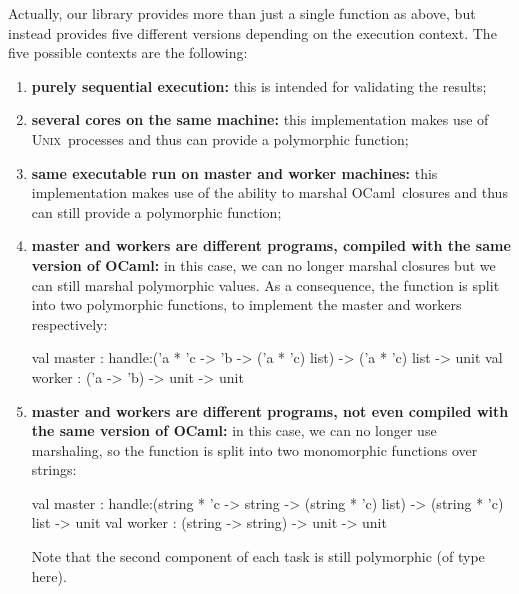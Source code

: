 \documentclass[preprint]{sigplanconf}
\newcommand{\Ocaml}{OCaml}
\newcommand{\unix}{\textsc{Unix}}
\begin{document}
Actually, our library provides more than just a single 
function as above, but instead provides five different versions
depending on the execution context. The five possible contexts are the
following: 
\begin{enumerate}
\item \textbf{purely sequential execution:}
  this is intended for validating the results;

\item \textbf{several cores on the same machine:} 
  this implementation makes use of \unix\ processes and thus can
  provide a polymorphic  function;

\item \textbf{same executable run on master and worker machines:}
  this implementation makes use of the ability to marshal \Ocaml\
  closures and thus can still provide a polymorphic  function;

\item \textbf{master and workers are different programs, compiled with
    the same version of \Ocaml:} 
  in this case, we can no longer marshal closures but we can still
  marshal polymorphic values. As a consequence, 
  the  function is split into two
  polymorphic functions, to implement the master and workers respectively:
  \begin{ocaml}
val master : 
  handle:('a * 'c -> 'b -> ('a * 'c) list) -> 
  ('a * 'c) list -> unit
val worker : ('a -> 'b) -> unit -> unit
  \end{ocaml}

\item \textbf{master and workers are different programs, not even
    compiled with the same version of \Ocaml:} in this case, we can no
  longer use marshaling, so the
   function is split into two monomorphic functions
  over strings: 
  \begin{ocaml}
val master : 
  handle:(string * 'c -> string -> (string * 'c) list) -> 
  (string * 'c) list -> unit
val worker : (string -> string) -> unit -> unit
  \end{ocaml}
  Note that the second component of each task is still polymorphic (of
  type \ocaml{'c} here).
\end{enumerate}
\end{document}
